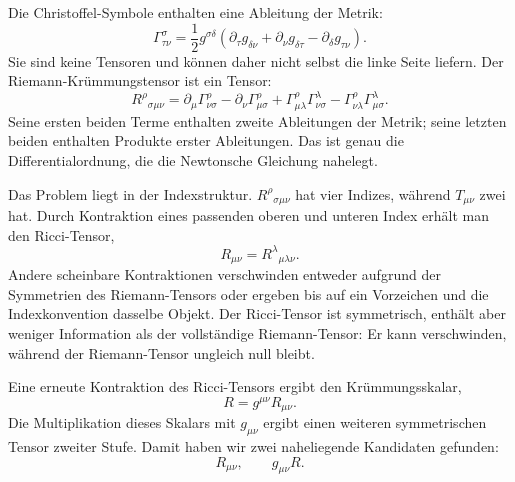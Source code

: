 Die Christoffel-Symbole enthalten eine Ableitung der Metrik:
\begin{equation}
 \Gamma^\sigma_{\tau\nu}
 =
 \frac12 g^{\sigma\delta}
 \left(
 \partial_\tau g_{\delta\nu}
 +\partial_\nu g_{\delta\tau}
 -\partial_\delta g_{\tau\nu}
 \right).
 \label{eq:christoffel}
\end{equation}
Sie sind keine Tensoren und können daher nicht selbst die linke Seite liefern. Der Riemann-Krümmungstensor ist ein Tensor:
\begin{equation}
 R^\rho{}_{\sigma\mu\nu}
 =
 \partial_\mu\Gamma^\rho_{\nu\sigma}
 -\partial_\nu\Gamma^\rho_{\mu\sigma}
 +\Gamma^\rho_{\mu\lambda}\Gamma^\lambda_{\nu\sigma}
 -\Gamma^\rho_{\nu\lambda}\Gamma^\lambda_{\mu\sigma}.
 \label{eq:riemann}
\end{equation}
Seine ersten beiden Terme enthalten zweite Ableitungen der Metrik; seine letzten beiden enthalten Produkte erster Ableitungen. Das ist genau die Differentialordnung, die die Newtonsche Gleichung nahelegt.

Das Problem liegt in der Indexstruktur. \(R^\rho{}_{\sigma\mu\nu}\) hat vier Indizes, während \(T_{\mu\nu}\) zwei hat. Durch Kontraktion eines passenden oberen und unteren Index erhält man den Ricci-Tensor,
\begin{equation}
 R_{\mu\nu}=R^\lambda{}_{\mu\lambda\nu}.
 \label{eq:ricci}
\end{equation}
Andere scheinbare Kontraktionen verschwinden entweder aufgrund der Symmetrien des Riemann-Tensors oder ergeben bis auf ein Vorzeichen und die Indexkonvention dasselbe Objekt. Der Ricci-Tensor ist symmetrisch, enthält aber weniger Information als der vollständige Riemann-Tensor: Er kann verschwinden, während der Riemann-Tensor ungleich null bleibt.

\begin{classroomqa}
\end{classroomqa}

Eine erneute Kontraktion des Ricci-Tensors ergibt den Krümmungsskalar,
\begin{equation}
 R=g^{\mu\nu}R_{\mu\nu}.
 \label{eq:ricci-scalar}
\end{equation}
Die Multiplikation dieses Skalars mit \(g_{\mu\nu}\) ergibt einen weiteren symmetrischen Tensor zweiter Stufe. Damit haben wir zwei naheliegende Kandidaten gefunden:
\begin{equation}
 R_{\mu\nu},
 \qquad
 g_{\mu\nu}R.
\end{equation}

